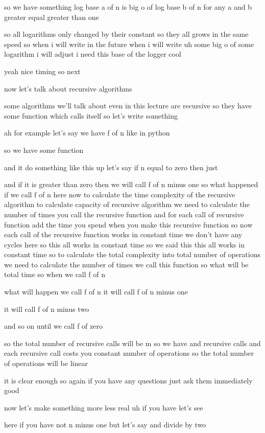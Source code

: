 so we have something log base a of n is big o of log base b of n for any a and b greater equal greater than one

so all logarithms only changed by their constant so they all grows in the same speed so when i will write in the future when i will write uh some big o of some logarithm i will adjust i need this base of the logger cool

yeah nice timing so next

now let's talk about recursive algorithms

some algorithms we'll talk about even in this lecture are recursive so they have some function which calls itself so let's write something

ah for example let's say we have f of n like in python

so we have some function

and it do something like this up let's say if n equal to zero then just

and if it is greater than zero then we will call f of n minus one so what happened if we call f of n here now to calculate the time complexity of the recursive algorithm to calculate capacity of recursive algorithm we need to calculate the number of times you call the recursive function and for each call of recursive function add the time you spend when you make this recursive function so now each call of the recursive function works in constant time we don't have any cycles here so this all works in constant time so we said this this all works in constant time so to calculate the total complexity into total number of operations we need to calculate the number of times we call this function so what will be total time so when we call f of n

what will happen we call f of n it will call f of n minus one

it will call f of n minus two

and so on until we call f of zero

so the total number of recursive calls will be m so we have and recursive calls and each recursive call costs you constant number of operations so the total number of operations will be linear

it is clear enough so again if you have any questions just ask them immediately good

now let's make something more less real uh if you have let's see

here if you have not n minus one but let's say and divide by two

